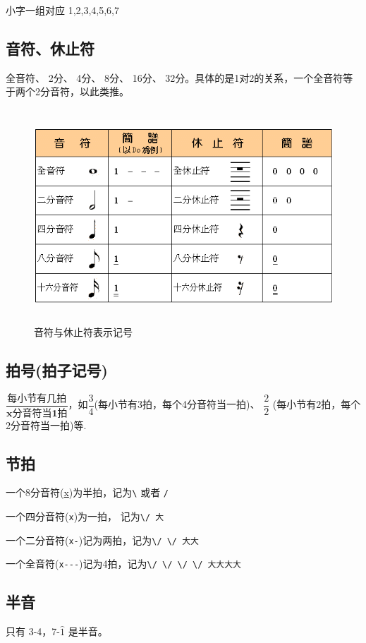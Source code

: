 \documentclass[UTF8,a4paper,12pt]{ctexbook}
\begin{document}
			小字一组对应 1,2,3,4,5,6,7 
	 
		\subsection*{音符、休止符}
			
			全音符、  2分、  4分、   8分、  16分、  32分。具体的是1对2的关系，一个全音符等于两个2分音符，以此类推。
		
			\begin{figure}[H]
				\centering
				\includegraphics[width=15cm,height=8cm]{yinfu}
				\caption{音符与休止符表示记号}
			\end{figure}
			
		\subsection*{拍号(拍子记号)}
			$\dfrac{\textbf{每小节有几拍}}{\textbf{x分音符当1拍}} $，如$\dfrac{3}{4} $(每小节有3拍，每个4分音符当一拍)、  $\dfrac{2}{2} $ (每小节有2拍，每个2分音符当一拍)等.
		
		\subsection*{节拍}
			一个8分音符(\underline{x})为半拍，记为\verb|\| 或者 \verb|/|
		
			一个四分音符(\verb|x|)为一拍， 记为\verb|\/ 大|

			一个二分音符(\verb|x-|)记为两拍，记为\verb|\/ \/ 大大|
			
			一个全音符(\verb|x---|)记为4拍，记为\verb|\/ \/ \/ \/ 大大大大|	
			
					
		\subsection*{半音}
			只有 3-4，7-$\hat{1}$ 是半音。
			
\end{document}
